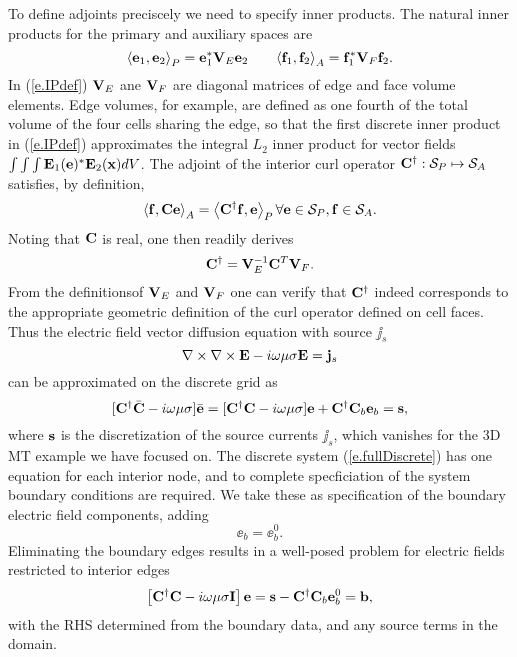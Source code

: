 To define adjoints preciscely we need to specify
inner products.  The natural inner products for the primary
and auxiliary spaces are
\begin{equation}
\label{e.IPdef}
\left< {\bf e}_1 , {\bf e}_2 \right>_P = {\bf e}_1^*{\bf V}_E{\bf e}_2
\,\,\,\,\,\,\,\,\,\,\,
\left< {\bf f}_1 , {\bf f}_2 \right>_A = {\bf f}_1^*{\bf V}_F{\bf f}_2 .
\end{equation}
In (\ref{e.IPdef}) ${\bf V}_E$ ane ${\bf V}_F$ are diagonal matrices of edge 
and face volume elements.  Edge volumes, for example, are
defined as one fourth
of the total volume of the four cells sharing the edge,
so that the first discrete inner product in (\ref{e.IPdef})
approximates the integral $L_2$ inner product for vector fields
$\int\int\int {\bf E}_1({\bf e})^*{\bf E}_2({\bf x}) dV$.
The adjoint of the interior curl operator
${\bf C}^{\dagger} : {\cal S}_P \mapsto {\cal S}_A$
satisfies, by definition,
\begin{equation}
\left< {\bf f} , {\bf C}{\bf e} \right>_A =  
\left< {\bf C}^\dagger {\bf f} , {\bf e} \right>_P  
\forall {\bf e}\in{\cal S}_P, {\bf f}\in{\cal S}_A .
\end{equation}
Noting that ${\bf C}$ is real, one then readily derives
\begin{equation}
\label{e.Cadjt}
{\bf C}^\dagger = {\bf V}_E^{-1}{\bf C}^T{\bf V}_F .
\end{equation}
From the definitionsof ${\bf V}_E$ and ${\bf V}_F$ one can verify that
${\bf C}^{\dagger}$ indeed corresponds to the appropriate
geometric definition of the curl operator defined on cell
faces.  Thus the electric field vector diffusion equation with
source $\jj_s$
\begin{equation}
\nabla \times \nabla \times {\bf E} - i \omega \mu \sigma{\bf E}
= {\bf j}_s
\end{equation}
can be approximated on the discrete grid as
\begin{equation}
\label{e.fullDiscrete}
[{\bf C}^{\dagger}\bar{{\bf C}} -i\omega\mu\sigma]\bar{{\bf e}} = 
[{\bf C}^{\dagger}{\bf C} -i\omega\mu\sigma]{\bf e} + {\bf C}^{\dagger}{\bf C}_b{\bf e}_b
= {\bf s} ,
\end{equation}
where $\bf s$ is the discretization of the source currents $\jj_s$,
which vanishes for the 3D MT example we have focused on.
The discrete system (\ref{e.fullDiscrete}) has one equation
for each interior node, and to complete specficiation of the
system boundary conditions are required.  We take these
as specification of the boundary electric field components,
adding
\begin{equation}
\ee_b = \ee_b^0 .
\end{equation}
Eliminating the boundary edges results in a well-posed problem
for electric fields restricted to interior edges
\begin{equation}
\label{e.Discrete}
\left[
{\bf C}^\dagger {\bf C} - i \omega\mu\sigma{\bf I}
\right] {\bf e} = 
{\bf s} - {\bf C}^\dagger{\bf C}_b{\bf e}_b^0 = {\bf b} ,
\end{equation}
with the RHS determined from the boundary
data, and any source terms in the domain.

